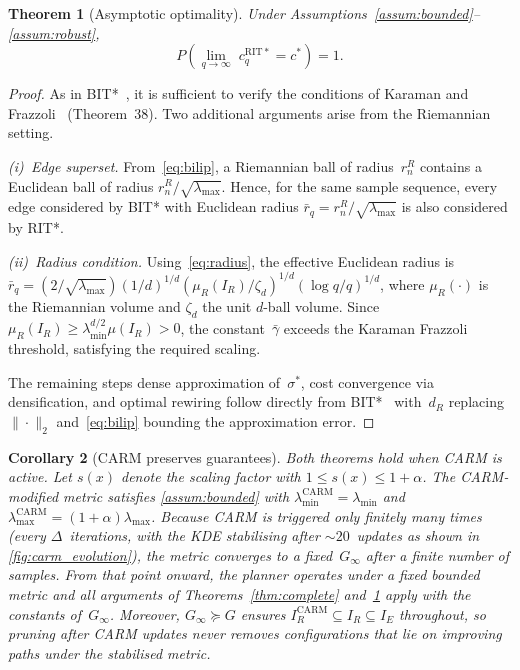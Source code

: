 \documentclass[journal]{IEEEtran}
\newtheorem{theorem}{Theorem}
\newtheorem{corollary}[theorem]{Corollary}
\newcommand{\IR}{I_{\!R}}
\newcommand{\IE}{I_{\!E}}
\newcommand{\dR}{d_{\!R}}
\newcommand{\muR}{\mu_{\!R}}
\begin{document}
\begin{theorem}[Asymptotic optimality]\label{thm:ao}
Under Assumptions~\ref{assum:bounded}--\ref{assum:robust},
\[
  P\!\left(\lim_{q \to \infty}\; c_q^{\mathrm{RIT*}}
  = c^*\right) = 1.
\]
\end{theorem}

\begin{proof}
As in BIT*~\cite{Gammell2020}, it is sufficient to verify the
conditions of Karaman and Frazzoli~\cite{Karaman2011}
(Theorem~38). Two additional arguments arise from the
Riemannian setting.

\emph{(i)~Edge superset.}
From~\eqref{eq:bilip}, a Riemannian ball of radius~$r_n^R$
contains a Euclidean ball of radius
$r_n^R/\!\sqrt{\lambda_{\max}}$. Hence, for the same sample
sequence, every edge considered by BIT* with Euclidean
radius $\bar{r}_q = r_n^R/\!\sqrt{\lambda_{\max}}$ is also
considered by RIT*.

\emph{(ii)~Radius condition.}
Using~\eqref{eq:radius}, the effective Euclidean radius is
$\bar{r}_q =
(2/\!\sqrt{\lambda_{\max}})(1/d)^{1/d}
(\muR(\IR)/\zeta_d)^{1/d}(\log q/q)^{1/d}$,
where $\muR(\cdot)$ is the Riemannian volume and $\zeta_d$
the unit $d$-ball volume. Since
$\muR(\IR) \ge \lambda_{\min}^{d/2}\mu(\IR) > 0$, the
constant~$\bar\gamma$ exceeds the Karaman Frazzoli
threshold, satisfying the required scaling.

The remaining steps dense approximation of~$\sigma^*$,
cost convergence via densification, and optimal
rewiring follow directly from BIT*~\cite{Gammell2020}
with~$\dR$ replacing~$\|\cdot\|_2$
and~\eqref{eq:bilip} bounding the approximation error.
\end{proof}

\begin{corollary}[CARM preserves guarantees]\label{cor:carm}
Both theorems hold when CARM is active. Let $s(x)$ denote
the scaling factor with $1 \le s(x) \le 1 + \alpha$. The
CARM-modified metric satisfies \cref{assum:bounded} with
$\lambda_{\min}^{\mathrm{CARM}} = \lambda_{\min}$ and
$\lambda_{\max}^{\mathrm{CARM}} = (1+\alpha)\lambda_{\max}$.
Because CARM is triggered only finitely many times (every
$\Delta$~iterations, with the KDE stabilising after
${\sim}20$~updates as shown in \cref{fig:carm_evolution}),
the metric converges to a fixed~$G_\infty$ after a finite
number of samples. From that point onward, the planner
operates under a fixed bounded metric and all arguments of
Theorems~\ref{thm:complete} and~\ref{thm:ao} apply with the
constants of~$G_\infty$. Moreover,
$G_\infty \succeq G$ ensures
$\IR^{\mathrm{CARM}} \subseteq \IR \subseteq \IE$
throughout, so pruning after CARM updates never removes
configurations that lie on improving paths under the
stabilised metric.
\end{corollary}
\end{document}

